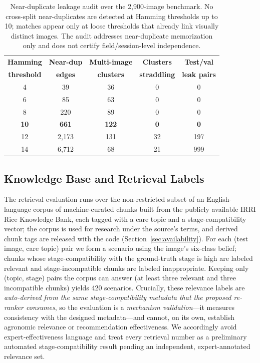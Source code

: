 \documentclass[conference]{IEEEtran}
\begin{document}
\begin{table}[t]
\centering
\caption{Near-duplicate leakage audit over the 2{,}900-image benchmark. No cross-split near-duplicates are detected at Hamming thresholds up to 10; matches appear only at loose thresholds that already link visually distinct images. The audit addresses near-duplicate memorization only and does not certify field/session-level independence.}
\label{tab:leakage}
\small
\begin{tabular}{ccccc}
\toprule
\textbf{Hamming} & \textbf{Near-dup} & \textbf{Multi-image} & \textbf{Clusters} & \textbf{Test/val} \\
\textbf{threshold} & \textbf{edges} & \textbf{clusters} & \textbf{straddling} & \textbf{leak pairs} \\
\midrule
4 & 39 & 36 & 0 & 0 \\
6 & 85 & 63 & 0 & 0 \\
8 & 220 & 89 & 0 & 0 \\
\textbf{10} & \textbf{661} & \textbf{122} & \textbf{0} & \textbf{0} \\
12 & 2{,}173 & 131 & 32 & 197 \\
14 & 6{,}712 & 68 & 21 & 999 \\
\bottomrule
\end{tabular}
\end{table}

\subsection{Knowledge Base and Retrieval Labels}

The retrieval evaluation runs over the non-restricted subset of an English-language corpus of machine-curated chunks built from the publicly available IRRI Rice Knowledge Bank, each tagged with a care topic and a stage-compatibility vector; the corpus is used for research under the source's terms, and derived chunk tags are released with the code (Section~\ref{sec:availability}). For each (test image, care topic) pair we form a scenario using the image's six-class belief; chunks whose stage-compatibility with the ground-truth stage is high are labeled relevant and stage-incompatible chunks are labeled inappropriate. Keeping only (topic, stage) pairs the corpus can answer (at least three relevant and three incompatible chunks) yields 420 scenarios. Crucially, these relevance labels are \emph{auto-derived from the same stage-compatibility metadata that the proposed re-ranker consumes}, so the evaluation is a \emph{mechanism validation}---it measures consistency with the designed metadata---and cannot, on its own, establish agronomic relevance or recommendation effectiveness. We accordingly avoid expert-effectiveness language and treat every retrieval number as a preliminary automated stage-compatibility result pending an independent, expert-annotated relevance set.
\end{document}
